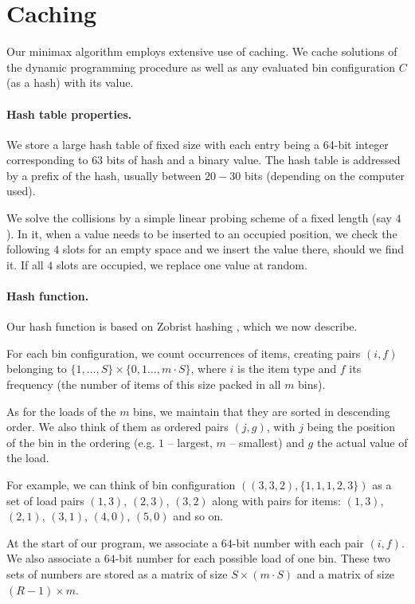 \section{Caching}\label{sec:4:caching}

Our minimax algorithm employs extensive use of caching. We cache
solutions of the dynamic programming procedure \MaxFeas as well as any
evaluated bin configuration $C$ (as a hash) with its value.

\paragraph{Hash table properties.} We store a large hash table of
fixed size with each entry being a 64-bit integer corresponding to
$63$ bits of hash and a binary value. The hash table is addressed
by a prefix of the hash, usually between $20-30$ bits (depending
on the computer used).

We solve the collisions by a simple linear probing scheme of a fixed
length (say $4$). In it, when a value needs to be inserted to an
occupied position, we check the following $4$ slots for an empty space
and we insert the value there, should we find it. If all $4$ slots are
occupied, we replace one value at random.

\paragraph{Hash function.} Our hash function is based on Zobrist
hashing \cite{zobrist}, which we now describe.

For each bin configuration, we count occurrences of items, creating
pairs $(i,f)$ belonging to $\{1,\ldots,S\} \times \{0,1\ldots,m\cdot
S\}$, where $i$ is the item type and $f$ its frequency (the number of
items of this size packed in all $m$ bins).

As for the loads of the $m$ bins, we maintain that they are sorted in
descending order. We also think of them as ordered pairs $(j,g)$, with
$j$ being the position of the bin in the ordering (e.g. $1$ --
largest, $m$ -- smallest) and $g$ the actual value of the load.

For example, we can think of bin configuration
$((3,3,2),\{1,1,1,2,3\})$ as a set of load pairs $(1,3)$, $(2,3)$,
$(3,2)$ along with pairs for items: $(1,3)$, $(2,1)$, $(3,1)$,
$(4,0)$, $(5,0)$ and so on.

At the start of our program, we associate a $64$-bit number with each
pair $(i,f)$. We also associate a $64$-bit number for each possible
load of one bin. These two sets of numbers are stored as a matrix of
size $S \times (m\cdot S)$ and a matrix of size $(R-1) \times m$.

